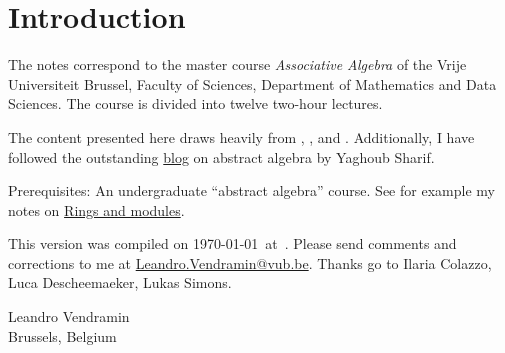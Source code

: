 \section*{Introduction}

The notes correspond to the master  
course \emph{Associative Algebra} of the 
Vrije Universiteit Brussel, 
Faculty of Sciences, 
Department of Mathematics and Data Sciences. The course
is divided into twelve two-hour lectures. 

The content presented here draws heavily from \cite{MR3308118}, \cite{MR1449137}, 
and \cite{MR798076}. Additionally, I have 
followed the outstanding \href{https://ysharifi.wordpress.com}{blog} on 
abstract algebra by Yaghoub Sharif.

Prerequisites: An undergraduate ``abstract algebra'' course. See for example
my notes on \href{https://github.com/vendramin/rings}{Rings and modules}. 

\medskip
This version 
was compiled on \today~at~\currenttime.
Please send comments and corrections to me at \url{Leandro.Vendramin@vub.be}. 
Thanks go to Ilaria Colazzo, 
Luca Descheemaeker, Lukas Simons.   


\bigskip
\begin{flushright}
Leandro Vendramin\\Brussels, Belgium\par
\end{flushright}

